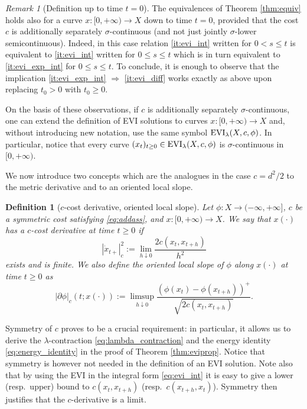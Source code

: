 \documentclass[reqno]{amsart}
\newcounter{results}[section]
\theoremstyle{plain}
\theoremstyle{remark}
\newtheorem{remark}[results]{Remark}
\theoremstyle{plain}
\newtheorem{definition}[results]{Definition}
\numberwithin{equation}{section}
\theoremstyle{remark}
\DeclareMathOperator{\EVI}{{\rm EVI}}
\begin{document}
\begin{remark}[Definition up to time  $t=0$]\label{rem:t0}  The equivalences of  Theorem \ref{thm:equiv} holds also for a curve $x:[0,+\infty) \to X$ down to time $t=0$, provided  that  the cost $c$ is  additionally  separately $\sigma$-continuous (and not just  jointly  $\sigma$-lower semicontinuous).   Indeed,  in this case  relation  \ref{it:evi_int} written for $0<s \le t$ is equivalent to \ref{it:evi_int} written  for  $0 \le s \le t$ which is in turn equivalent to \ref{it:evi_exp_int}  for  $0 \le s \le t$. To conclude, it is enough to observe that the implication \ref{it:evi_exp_int} $\Rightarrow$ \ref{it:evi_diff} works exactly  as above   upon replacing $t_0>0$ with $t_0 \ge 0$.

 On the basis of these observations, if $c$ is  additionally  separately $\sigma$-continuous,  one can extend the definition of EVI solutions to curves $x:[0,+\infty) \to X$ and, without introducing new notation, use the same symbol $\EVI_\lambda(X,c, \phi)$.  In particular, notice that every curve $(x_t)_{t \ge 0} \in \EVI_\lambda(X,c, \phi)$ is $\sigma$-continuous in $[0,+\infty)$.
\end{remark}



We now introduce two concepts which are the analogues in the case $c={d^2}/{2}$ to the metric derivative and to an oriented local slope.

\begin{definition}[$c$-cost derivative, oriented local slope] Let $\phi:X\to (-\infty, + \infty]$, $c$ be a symmetric cost satisfying \eqref{eq:addass}, and $x:[0,+\infty)\to X$. We  say that $x(\cdot)$ has a \emph{$c$-cost derivative} at time $t  \ge 0 $ if
    \begin{equation}\label{eq:def_c_derivative}
        |\dot x_{t+ }|_c^2:=\lim_{h\downarrow 0}\frac{2c(x_t,x_{t+h})}{h^2}
    \end{equation}
    exists and is finite. We also define the oriented local slope of $\phi$ along $x(\cdot)$ at time $t\ge 0$ as
\begin{equation}\label{eq:def_local_slope_along}
    |\partial \phi|_c(t;x(\cdot)):=\limsup_{h\downarrow 0} \frac{(\phi(x_t)-\phi(x_{t+h}))^+}{\sqrt{2 c(x_{t},x_{t+h})}}.
   \end{equation}
\end{definition}
Symmetry of $c$ proves to be a crucial requirement: in particular, it allows us to derive the $\lambda$-contraction \eqref{eq:lambda_contraction} and the energy identity \eqref{eq:energy_identity} in the proof of Theorem \ref{thm:eviprop}. Notice that symmetry is however not needed in the definition of an EVI solution. Note also that by using the EVI in the integral form \eqref{eq:evi_int} it is easy to give a lower (resp.\ upper) bound to $c(x_t,x_{t+h})$ (resp.\ $c(x_{t+h},x_t)$). Symmetry then justifies that the $c$-derivative is a limit. 
\end{document}

